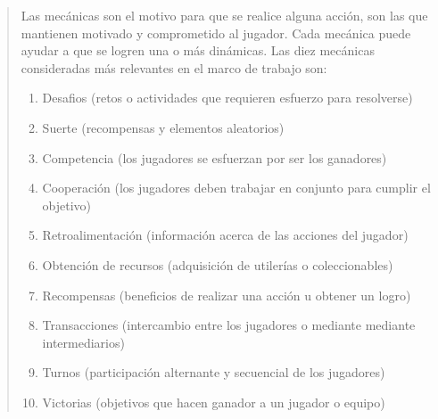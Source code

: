  \begin{quote}
    Las mecánicas son el motivo para que se realice alguna acción, son las que mantienen
    motivado y comprometido al jugador. Cada mecánica puede ayudar a que se logren una o
    más dinámicas. Las diez mecánicas consideradas más relevantes en el marco de trabajo
    son:
   
    \begin{enumerate}
        \item Desafios (retos o actividades que requieren esfuerzo para resolverse)
        \item Suerte (recompensas y elementos aleatorios)
        \item Competencia (los jugadores se esfuerzan por ser los ganadores)
        \item Cooperación (los jugadores deben trabajar en conjunto para cumplir el objetivo)
        \item Retroalimentación (información acerca de las acciones del jugador)
        \item Obtención de recursos (adquisición de utilerías o coleccionables)
        \item Recompensas (beneficios de realizar una acción u obtener un logro)
        \item Transacciones (intercambio entre los jugadores o mediante mediante intermediarios)
        \item Turnos (participación alternante y secuencial de los jugadores)
        \item Victorias (objetivos que hacen ganador a un jugador o equipo)\\
    \end{enumerate}
 \end{quote}


